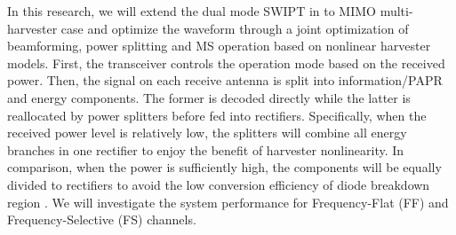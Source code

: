 In this research, we will extend the dual mode SWIPT in \cite{Park2018} to MIMO multi-harvester case and optimize the waveform through a joint optimization of beamforming, power splitting and MS operation based on nonlinear harvester models. First, the transceiver controls the operation mode based on the received power. Then, the signal on each receive antenna is split into information/PAPR and energy components. The former is decoded directly while the latter is reallocated by power splitters before fed into rectifiers. Specifically, when the received power level is relatively low, the splitters will combine all energy branches in one rectifier to enjoy the benefit of harvester nonlinearity. In comparison, when the power is sufficiently high, the components will be equally divided to rectifiers to avoid the low conversion efficiency of diode breakdown region \cite{Clerckx2019}. We will investigate the system performance for Frequency-Flat (FF) and Frequency-Selective (FS) channels.